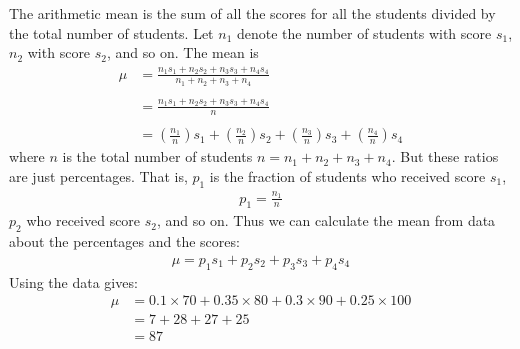 \documentclass[12pt]{article}
\begin{document}
\begin{answer}
The arithmetic mean is the sum of all the scores for all the students divided by the total number of students. Let $n_1$ denote the number of students with score $s_1$, $n_2$ with score $s_2$, and so on. The mean is
\begin{align*}
\mu 
& = \frac{n_{1}s_{1}+n_{2}s_{2}+n_{3}s_{3}+n_{4}s_{4}}{n_{1}+n_{2}+n_{3}+n_{4}} \\ & \\
& = \frac{n_{1}s_{1}+n_{2}s_{2}+n_{3}s_{3}+n_{4}s_{4}}{n} \\ & \\
& = 
\left(\frac{n_{1}}{n}\right)s_{1} + \left(\frac{n_{2}}{n}\right)s_{2} + \left(\frac{n_{3}}{n}\right)s_{3} + \left(\frac{n_{4}}{n}\right)s_{4}
\end{align*}
where $n$ is the total number of students $n=n_{1}+n_{2}+n_{3}+n_{4}$. But these ratios are just percentages. That is, $p_{1}$ is the fraction of students who received score $s_{1}$,
\begin{align*}
p_{1} = \frac{n_{1}}{n}
\end{align*}
$p_{2}$ who received score $s_{2}$, and so on. Thus we can calculate the mean from data about the percentages and the scores:
\begin{align*}
\mu = p_{1}s_{1} + p_{2}s_{2} + p_{3}s_{3} + p_{4}s_{4}
\end{align*}
Using the data gives:
\begin{align*}
\mu 
& = 0.1 \times 70 + 0.35 \times 80 + 0.3 \times 90 + 0.25 \times 100 \\
& = 7 + 28 + 27 +  25 \\
& = 87
\end{align*}

\end{answer}
\end{document}
